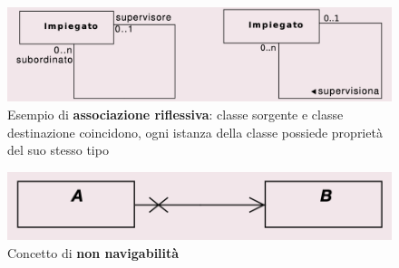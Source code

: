 \vspace{20pt}

\begin{figure}[h!]
    \centering
    \includegraphics[width=1\linewidth]{assets/UML/class/class-14.png}
    \caption{Esempio di \textbf{associazione riflessiva}: classe sorgente e classe destinazione coincidono, ogni istanza della classe possiede proprietà del suo stesso tipo}
\end{figure}

\vspace{20pt}

\begin{figure}[h!]
    \centering
    \includegraphics[width=1\linewidth]{assets/UML/class/class-15.png}
    \caption{Concetto di \textbf{non navigabilità}}
\end{figure}

\newpage
